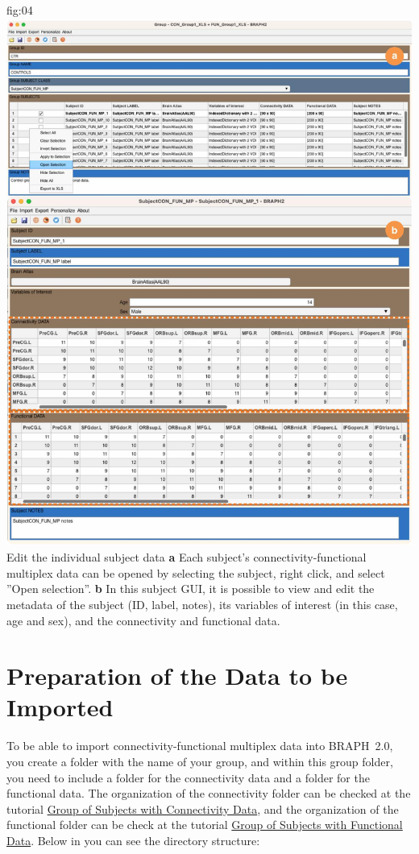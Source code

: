 \documentclass[justified]{tufte-handout}
\begin{document}
	{fig:04}
	{\includegraphics{fig04.jpg}
	}
	{Edit the individual subject data}
	{
	{\bf a}  Each subject's connectivity-functional multiplex data can be opened by selecting the subject, right click, and select ''Open selection''. 
	{\bf b} In this subject GUI, it is possible to view and edit the metadata of the subject (ID, label, notes), its variables of interest (in this case, age and sex), and the connectivity and functional data. 
	}

\clearpage
\section{Preparation of the Data to be Imported}

To be able to import connectivity-functional multiplex data into BRAPH~2.0, you create a folder with the name of your group, and within this group folder, you need to include a folder for the connectivity data and a folder for the functional data. The organization of the connectivity folder can be checked at the tutorial \href{https://github.com/braph-software/BRAPH-2/tree/develop/tutorials/general/tut_gr_con}{Group of Subjects with Connectivity Data}, and the organization of the functional folder can be check at the tutorial \href{https://github.com/braph-software/BRAPH-2/tree/develop/tutorials/general/tut_gr_fun}{Group of Subjects with Functional Data}. Below in  you can see the directory structure:
\end{document}
